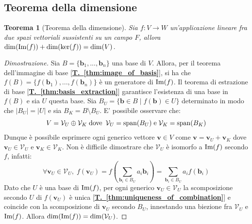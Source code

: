 \documentclass{article}
\newtheorem{theorem}{Teorema}
\begin{document}
    
\vspace{10pt}
\subsection{Teorema della dimensione} \label{subsec:linappdimtheorem}
    \begin{theorem}[Teorema della dimensione] \label{thm:dimension}
        Sia $f : V \rightarrow W$ un'applicazione lineare fra due spazi vettoriali sussistenti su un campo $F$, allora $\dim(\textnormal{Im}(f)) + \dim(\ker(f)) = \dim(V)$.
    \end{theorem}

    \begin{proof}[Dimostrazione] 
        Sia $B = \{ \mathbf{b}_{1}, ..., \mathbf{b}_{n} \}$ una base di $V$. Allora, per il teorema dell'immagine di base [{\bfseries \hyperref[thm:image_of_basis]{T.~\ref{thm:image_of_basis}}}], si ha che $f(B) = \{f(\mathbf{b}_{1}), ..., f(\mathbf{b}_{n})\}$ è un generatore di $\textnormal{Im}(f)$. 
        Il teorema di estrazione di base [{\bfseries \hyperref[thm:basis_extraction]{T.~\ref{thm:basis_extraction}}}] garantisce l'esistenza di una base in $f(B)$ e sia $U$ questa base. Sia $B_U = \{\mathbf{b} \in B \; | \; f(\mathbf{b}) \in U\}$ determinato in modo che $|B_U| = |U|$ e sia $B_K = B \setminus B_U$. E' possibile osservare che:
        \[
            V = \mathcal{V}_U \oplus \mathcal{V}_K \; \textnormal{dove} \;\: \mathcal{V}_U = \textnormal{span}(B_U) \; \textnormal{e} \; \mathcal{V}_K = \textnormal{span}(B_K)
        \]
        Dunque è possibile esprimere ogni generico vettore $\mathbf{v} \in V$ come $\mathbf{v} = \mathbf{v}_U + \mathbf{v}_K$ dove $\mathbf{v}_U \in \mathcal{V}_U$ e $\mathbf{v}_K \in \mathcal{V}_K$.
        Non è difficile dimostrare che $\mathcal{V}_U$ è isomorfo a $\textnormal{Im}(f)$ secondo $f$, infatti:
        \[
            \forall \mathbf{v}_U \in \mathcal{V}_U, \; f(\mathbf{v}_U) = f(\sum_{\mathbf{b}_{i} \in B_U} a_i \mathbf{b}_{i}) = \sum_{\mathbf{b}_{i} \in B_U} a_i f(\mathbf{b}_{i})
        \]
        Dato che $U$ è una base di $\textnormal{Im}(f)$, per ogni generico $\mathbf{v}_U \in \mathcal{V}_U$ la scomposizione secondo $U$ di $f(\mathbf{v}_U)$ è unica [{\bfseries \hyperref[thm:uniqueness_of_combination]{T.~\ref{thm:uniqueness_of_combination}}}] e coincide con la scomposizione di $\mathbf{v}_U$ secondo $B_U$, innestando una biezione fra $\mathcal{V}_U$ e $\textnormal{Im}(f)$. 
        Allora $\dim(\textnormal{Im}(f)) = \dim(\mathcal{V}_U)$.


\end{proof}
\end{document}
